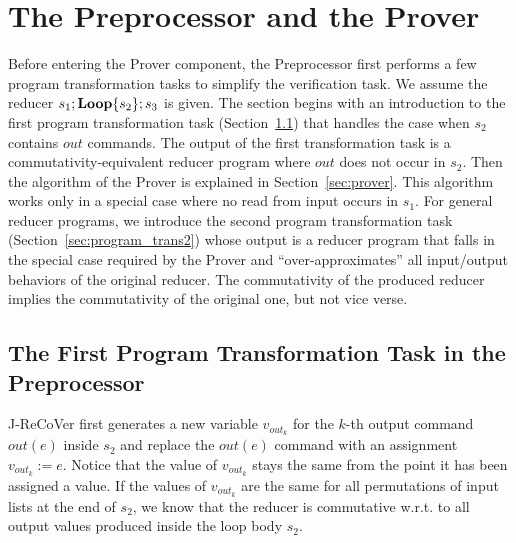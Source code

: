 \documentclass{llncs}
\newcommand{\rloop}{
	\ifmmode
	\mathbf{Loop}
	\else
	\textbf{Loop}
	\fi}
\begin{document}
\section{The Preprocessor and the Prover}
\label{sec:preprocessor_prover}

Before entering the Prover component, the Preprocessor first performs a few program transformation tasks to simplify the verification task.
We assume the reducer $s_1;\rloop\{s_2\};s_3$ is given. The section begins with an introduction to the first program transformation task (Section~\ref{sec:program_trans1}) that handles the case when $s_2$ contains $out$ commands. The output of the first transformation task is a commutativity-equivalent reducer program where $out$ does not occur in $s_2$.  Then the algorithm of the Prover is explained in Section~\ref{sec:prover}. This algorithm works only in a special case where no read from input occurs in $s_1$. For general reducer programs, we introduce the second program transformation task (Section~\ref{sec:program_trans2}) whose output is a reducer program that falls in the special case required by the Prover and ``over-approximates'' all input/output behaviors of the original reducer. The commutativity of the produced reducer implies the commutativity of the original one, but not vice verse.

\subsection{The First Program Transformation Task in the Preprocessor}
\label{sec:program_trans1}
J-ReCoVer  first generates a new variable $v_{out_k}$ for the $k$-th output command $out(e)$ inside $s_2$ and replace the $out(e)$ command with an assignment $v_{out_k}:=e$.
Notice that the value of $v_{out_k}$ stays the same from the point it has been assigned a value.
If the values of $v_{out_k}$ are the same for all permutations of input lists at the end of $s_2$, we know that the reducer is commutative w.r.t. to all output values produced inside the loop body $s_2$.
\end{document}
